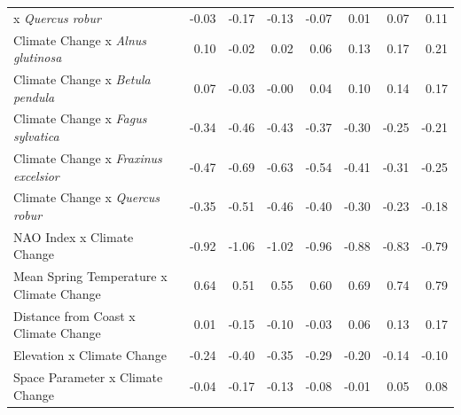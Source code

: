 \documentclass{article}\usepackage[]{graphicx}\usepackage[]{color}
\begin{document}
\begin{longtable}{lrrrrrrr}
x\textit{ Quercus robur} & -0.03 & -0.17 & -0.13 & -0.07 & 0.01 & 0.07 & 0.11 \\ 
  Climate Change
x\textit{ Alnus glutinosa} & 0.10 & -0.02 & 0.02 & 0.06 & 0.13 & 0.17 & 0.21 \\ 
  Climate Change
x\textit{ Betula pendula} & 0.07 & -0.03 & -0.00 & 0.04 & 0.10 & 0.14 & 0.17 \\ 
  Climate Change
x\textit{ Fagus sylvatica} & -0.34 & -0.46 & -0.43 & -0.37 & -0.30 & -0.25 & -0.21 \\ 
  Climate Change
x\textit{ Fraxinus excelsior} & -0.47 & -0.69 & -0.63 & -0.54 & -0.41 & -0.31 & -0.25 \\ 
  Climate Change
x\textit{ Quercus robur} & -0.35 & -0.51 & -0.46 & -0.40 & -0.30 & -0.23 & -0.18 \\ 
  NAO Index x Climate Change & -0.92 & -1.06 & -1.02 & -0.96 & -0.88 & -0.83 & -0.79 \\ 
  Mean Spring 
Temperature x Climate Change & 0.64 & 0.51 & 0.55 & 0.60 & 0.69 & 0.74 & 0.79 \\ 
  Distance from 
Coast x Climate Change & 0.01 & -0.15 & -0.10 & -0.03 & 0.06 & 0.13 & 0.17 \\ 
  Elevation x Climate Change & -0.24 & -0.40 & -0.35 & -0.29 & -0.20 & -0.14 & -0.10 \\ 
  Space Parameter x Climate Change & -0.04 & -0.17 & -0.13 & -0.08 & -0.01 & 0.05 & 0.08 \\ 
   \hline
\hline
\end{longtable}
\end{document}
